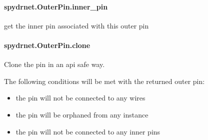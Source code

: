 \documentclass[letterpaper,10pt,english,openany,oneside]{sphinxmanual}
\begin{document}
\paragraph{spydrnet.OuterPin.inner\_pin}
\label{\detokenize{reference/classes/generated/spydrnet.OuterPin.inner_pin:spydrnet-outerpin-inner-pin}}\label{\detokenize{reference/classes/generated/spydrnet.OuterPin.inner_pin::doc}}

\begin{fulllineitems}
\label{\detokenize{reference/classes/generated/spydrnet.OuterPin.inner_pin:spydrnet.OuterPin.inner_pin}}
get the inner pin associated with this outer pin

\end{fulllineitems}



\paragraph{spydrnet.OuterPin.clone}
\label{\detokenize{reference/classes/generated/spydrnet.OuterPin.clone:spydrnet-outerpin-clone}}\label{\detokenize{reference/classes/generated/spydrnet.OuterPin.clone::doc}}

\begin{fulllineitems}
\label{\detokenize{reference/classes/generated/spydrnet.OuterPin.clone:spydrnet.OuterPin.clone}}
Clone the pin in an api safe way.

The following conditions will be met with the returned outer pin:
\begin{itemize}
\item {} 
the pin will not be connected to any wires

\item {} 
the pin will be orphaned from any instance

\item {} 
the pin will not be connected to any inner pins

\end{itemize}

\end{fulllineitems}
\end{document}
